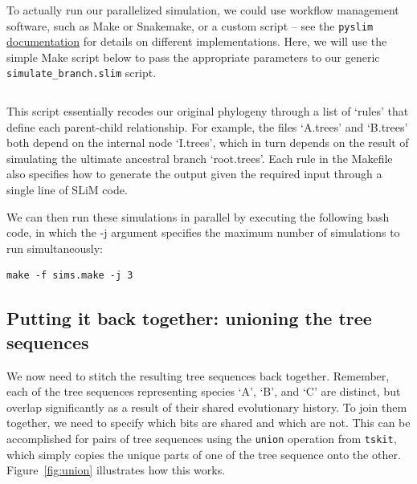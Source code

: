 \documentclass[12pt]{article}
\newcommand{\tskit}[0]{\texttt{tskit}\xspace}
\newcommand{\pyslim}[0]{\texttt{pyslim}\xspace}
\begin{document}
To actually run our parallelized simulation, we could use workflow management software, such as Make or Snakemake, or a custom script -- see the \pyslim
\href{https://tskit.dev/pyslim/docs/latest/vignette_parallel_phylo.html}{documentation} for details on different implementations. Here, we will use the simple Make script below to pass
the appropriate parameters to our generic \verb|simulate_branch.slim| script.
%
\inputminted[breaklines,fontsize=\small, breakanywhere=true, breakautoindent=true, linenos, bgcolor=gray!10]{basemake}{code/parallelizing_multiple_species/parallel_sims.make}
%
This script essentially recodes our original phylogeny through a list of `rules' that define each parent-child relationship.
For example, the files `A.trees' and `B.trees' both depend on the internal node `I.trees',
which in turn depends on the result of simulating the ultimate ancestral branch `root.trees'.
Each rule in the Makefile also specifies how to generate the output given the required input through a single line of SLiM code.

We can then run these simulations in parallel by executing the following bash code,
in which the -j argument specifies the maximum number of simulations to run simultaneously:
\begin{verbatim}
make -f sims.make -j 3
\end{verbatim}

\subsection{Putting it back together: unioning the tree sequences}

We now need to stitch the resulting tree sequences back together.
Remember, each of the tree sequences representing species `A', `B', and `C'
are distinct, but overlap significantly as a result of their shared evolutionary history.
To join them together, we need to specify which bits are shared and which are not.
This can be accomplished for pairs of tree sequences using the \verb|union| operation from \tskit,
which simply copies the unique parts of one of the tree sequence onto the other.
Figure~\ref{fig:union} illustrates how this works.
\end{document}
